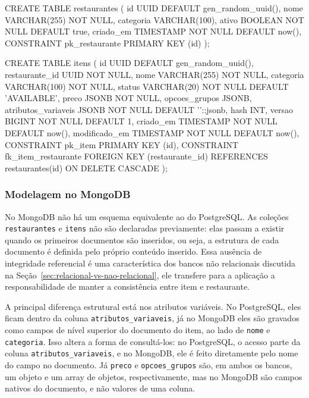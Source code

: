 \begin{codigo}[language=SQL, breaklines=true, caption={Criação das tabelas no PostgreSQL.}, label={lst:ddl}]
CREATE TABLE restaurantes (
  id          UUID DEFAULT gen_random_uuid(),
  nome        VARCHAR(255) NOT NULL,
  categoria   VARCHAR(100),
  ativo       BOOLEAN NOT NULL DEFAULT true,
  criado_em   TIMESTAMP NOT NULL DEFAULT now(),
  CONSTRAINT pk_restaurante PRIMARY KEY (id)
);

CREATE TABLE itens (
  id                    UUID DEFAULT gen_random_uuid(),
  restaurante_id        UUID NOT NULL,
  nome                  VARCHAR(255) NOT NULL,
  categoria             VARCHAR(100) NOT NULL,
  status                VARCHAR(20) NOT NULL DEFAULT 'AVAILABLE',
  preco                 JSONB NOT NULL,
  opcoes_grupos         JSONB,
  atributos_variaveis   JSONB NOT NULL DEFAULT '{}'::jsonb,
  hash                  INT,
  versao                BIGINT NOT NULL DEFAULT 1,
  criado_em             TIMESTAMP NOT NULL DEFAULT now(),
  modificado_em         TIMESTAMP NOT NULL DEFAULT now(),
  CONSTRAINT pk_item PRIMARY KEY (id),
  CONSTRAINT fk_item_restaurante FOREIGN KEY (restaurante_id)
    REFERENCES restaurantes(id) ON DELETE CASCADE
);
\end{codigo}

\subsubsection{Modelagem no MongoDB}

No MongoDB não há um esquema equivalente ao do PostgreSQL. As coleções \texttt{restaurantes} e \texttt{itens} não são declaradas previamente: elas passam a existir 
quando os primeiros documentos são inseridos, ou seja, a estrutura de cada documento é definida pelo próprio conteúdo inserido. Essa ausência de integridade referencial é uma 
característica dos bancos não relacionais discutida na Seção~\ref{sec:relacional-vs-nao-relacional}, ele transfere para a aplicação a responsabilidade de manter a consistência 
entre item e restaurante.

A principal diferença estrutural está nos atributos variáveis. No PostgreSQL, eles ficam dentro da coluna \texttt{atributos\_variaveis}, já no MongoDB 
eles são gravados como campos de nível superior do documento do item, ao lado de \texttt{nome} e \texttt{categoria}. Isso altera a forma de consultá-los: 
no PostgreSQL, o acesso parte da coluna \texttt{atributos\_variaveis}, e no MongoDB, ele é feito diretamente pelo nome do campo no documento. 
Já \texttt{preco} e \texttt{opcoes\_grupos} são, em ambos os bancos, um objeto e um array de objetos, respectivamente, mas no MongoDB são campos nativos do documento, 
e não valores de uma coluna. 

